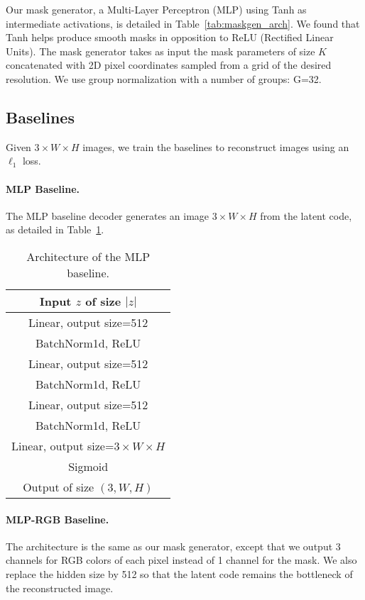 \documentclass[10pt,twocolumn,letterpaper]{article}
\begin{document}
Our mask generator, a Multi-Layer Perceptron (MLP) using Tanh as intermediate activations, is detailed in Table~\ref{tab:maskgen_arch}. We found that Tanh helps produce smooth masks in opposition to ReLU (Rectified Linear Units). The mask generator takes as input the mask parameters of size $K$ concatenated with 2D pixel coordinates sampled from a grid of the desired resolution. We use group normalization with a number of groups: G=32.

\subsection{Baselines}

Given $3\times W \times H$ images, we train the baselines to reconstruct images using an $\ell_1$ loss.

\paragraph{MLP Baseline.}
The MLP baseline decoder generates an image $3\times W \times H$ from the latent code, as detailed in Table~\ref{tab:mlp}. 

\begin{table}[ht]
	\caption{\label{tab:mlp} Architecture of the MLP baseline.}
   	\centering
   	\begin{tabular}{c}
		\toprule
	 	Input $z$ of size $|z|$ \\
       	\midrule
        Linear, output size=512 \\
        BatchNorm1d, ReLU \\
        \midrule
        Linear, output size=512 \\
        BatchNorm1d, ReLU \\
		\midrule
		Linear, output size=512 \\
        BatchNorm1d, ReLU \\
        \midrule
        Linear, output size=$3\times W \times H$ \\
        Sigmoid \\
		\midrule
        Output of size  $(3,W,H)$ \\
		\bottomrule
	\end{tabular}
\end{table}\paragraph{MLP-RGB Baseline.}
The architecture is the same as our mask generator, except that we output 3 channels for RGB colors of each pixel instead of 1 channel for the mask. We also replace the hidden size by 512 so that the latent code remains the bottleneck of the reconstructed image.
\end{document}
